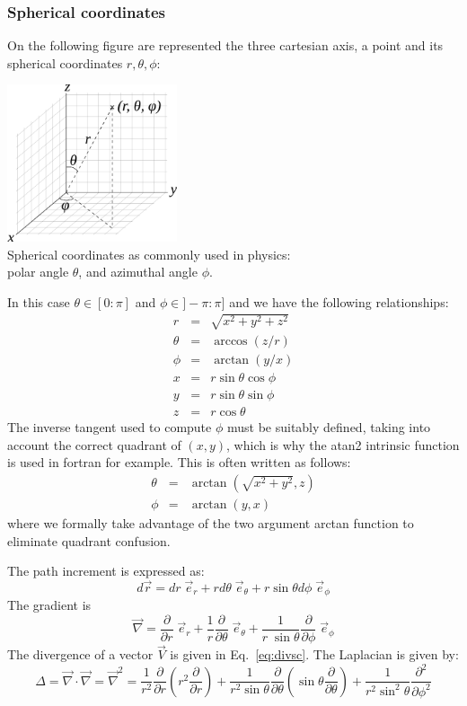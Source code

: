 \subsubsection{Spherical coordinates \label{ss:sphercoord}}

On the following figure are represented the three cartesian axis, 
a point and its spherical coordinates $r,\theta,\phi$:
\begin{center}
\includegraphics[width=5cm]{images/sphcoord}\\
{\captionfont Spherical coordinates as commonly used in physics:\\ polar angle $\theta$, and azimuthal angle $\phi$.} 
\end{center}
In this case $\theta\in[0:\pi]$ and $\phi\in]-\pi:\pi]$ and we have the following relationships:
\begin{eqnarray}
r &=& \sqrt{x^2+y^2+z^2} \\
\theta &=& \arccos (z/r) \\
\phi &=& \arctan (y/x) \\
x &=& r \sin \theta \cos \phi \\
y &=& r \sin\theta \sin\phi \\
z &=& r \cos\theta 
\end{eqnarray}
The inverse tangent used to compute $\phi$ must be suitably defined, 
taking into account the correct quadrant of $(x,y)$,
which is why the atan2 intrinsic function is used in fortran for example.    
This is often written as follows:
\begin{eqnarray}
\theta &=& \arctan \left(\sqrt{x^2+y^2},z\right) \\
\phi &=& \arctan (y,x) 
\end{eqnarray}
where we formally take advantage of the two argument arctan
function to eliminate quadrant confusion.

The path increment is expressed as:
\[
d\vec{r} = dr \; \vec{e}_r + r d\theta \; \vec{e}_\theta + r \sin\theta d\phi \; \vec{e}_\phi
\]
The gradient is 
\[
\vec\nabla = \frac{\partial}{\partial r} \; \vec{e}_r
+ \frac{1}{r} \frac{\partial}{\partial \theta} \; \vec{e}_\theta 
+ \frac{1}{r \; \sin\theta} \frac{\partial}{\partial \phi} \;  \vec{e}_\phi
\]
The divergence of a vector $\vec{V}$ is given in Eq.~\eqref{eq:divsc}. 
The Laplacian is given by: 
\[
\Delta = \vec\nabla \cdot\vec\nabla = \vec\nabla^2
=
\frac{1}{r^2}\frac{\partial}{\partial r} \left( r^2 \frac{\partial}{\partial r} \right)
+\frac{1}{r^2 \sin\theta} \frac{\partial}{\partial \theta} \left( \sin\theta \frac{\partial}{\partial \theta} \right)
+\frac{1}{r^2 \sin^2\theta}  \frac{\partial^2}{\partial \phi^2}
\]




